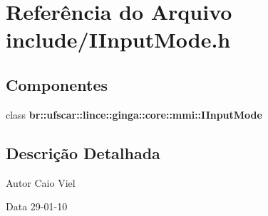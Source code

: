 \section{Referência do Arquivo include/IInputMode.h}
\label{IInputMode_8h}
\subsection*{Componentes}
\begin{DoxyCompactItemize}
\item 
class {\bf br::ufscar::lince::ginga::core::mmi::IInputMode}
\end{DoxyCompactItemize}


\subsection{Descrição Detalhada}
\begin{DoxyAuthor}{Autor}
Caio Viel 
\end{DoxyAuthor}
\begin{DoxyDate}{Data}
29-\/01-\/10 
\end{DoxyDate}
